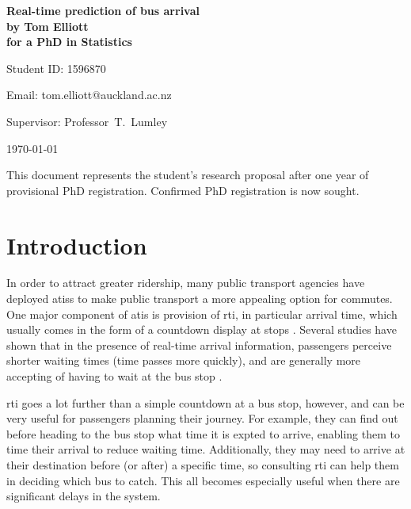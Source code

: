 \documentclass[12pt,a4paper]{article}
\begin{document}
\begin{Large}
\begin{center}
\textbf{Real-time prediction of bus arrival} \\
\textbf{by Tom Elliott} \\
\textbf{for a PhD in Statistics}
\end{center}
\end{Large}


\hfill{Student ID: 1596870}

\hfill{Email: tom.elliott@auckland.ac.nz}

Supervisor: Professor~T.~Lumley




\begin{center}
\today
\end{center}


This document represents the student's research proposal after
one year of provisional PhD registration.
Confirmed PhD registration is now sought.




\section{Introduction}
\label{sec:intro}

In order to attract greater ridership, many public transport agencies have deployed \glspl{atis}
to make public transport a more appealing option for commutes.
One major component of \gls{atis} is provision of \gls{rti},
in particular arrival time,
which usually comes in the form of a countdown display at stops
\citep{tcrp:2003}.
Several studies have shown that in the presence of real-time arrival information,
passengers perceive shorter waiting times (time passes more quickly),
and are generally more accepting of having to wait at the bus stop
\citep{tcrp:2003b}.


\gls{rti} goes a lot further than a simple countdown at a bus stop, however,
and can be very useful for passengers planning their journey.
For example, they can find out before heading to the bus stop what time it is expted to arrive,
enabling them to time their arrival to reduce waiting time.
Additionally, they may need to arrive at their destination before (or after) a specific time,
so consulting \gls{rti} can help them in deciding which bus to catch.
This all becomes especially useful when there are significant delays in the system.
\end{document}
